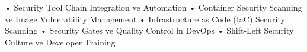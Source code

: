 • Security Tool Chain Integration ve Automation
• Container Security Scanning ve Image Vulnerability Management
• Infrastructure as Code (IaC) Security Scanning
• Security Gates ve Quality Control in DevOps
• Shift-Left Security Culture ve Developer Training